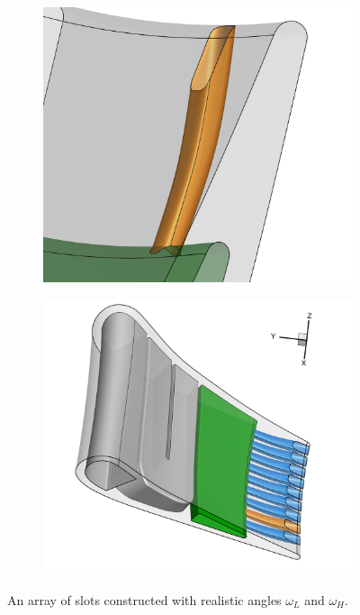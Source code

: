 \documentclass[a4paper, 11pt]{report}
\theoremstyle{definition}
\begin{document}
	\begin{figure}[H]
		\centering
		\begin{subfigure}{.35\textwidth}
			\includegraphics[width=\textwidth]{../tec/slots/12.png}
		\end{subfigure}
		\begin{subfigure}{.35\textwidth}
			\includegraphics[width=\textwidth]{../tec/slots/11.png}
		\end{subfigure}
		\caption{An array of slots constructed with realistic angles $\omega_L$ and $\omega_H$.}
		\label{fig:slots_real}
	\end{figure}
\end{document}

